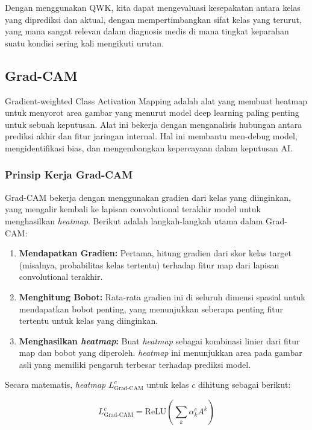 Dengan menggunakan QWK, kita dapat mengevaluasi kesepakatan antara kelas yang diprediksi dan aktual, dengan mempertimbangkan sifat kelas yang terurut, yang mana sangat relevan dalam diagnosis medis di mana tingkat keparahan suatu kondisi sering kali mengikuti urutan.

\subsection{Grad-CAM}
\label{sec:225}

Gradient-weighted Class Activation Mapping adalah alat yang membuat heatmap untuk menyorot area gambar yang menurut model deep learning paling penting untuk sebuah keputusan. Alat ini bekerja dengan menganalisis hubungan antara prediksi akhir dan fitur jaringan internal. Hal ini membantu men-debug model, mengidentifikasi bias, dan mengembangkan kepercayaan dalam keputusan AI.

\subsubsection{Prinsip Kerja Grad-CAM}

Grad-CAM bekerja dengan menggunakan gradien dari kelas yang diinginkan, yang mengalir kembali ke lapisan convolutional terakhir model untuk menghasilkan \emph{heatmap}. Berikut adalah langkah-langkah utama dalam Grad-CAM:

\begin{enumerate}
    \item \textbf{Mendapatkan Gradien:} Pertama, hitung gradien dari skor kelas target (misalnya, probabilitas kelas tertentu) terhadap fitur map dari lapisan convolutional terakhir.
    \item \textbf{Menghitung Bobot:} Rata-rata gradien ini di seluruh dimensi spasial untuk mendapatkan bobot penting, yang menunjukkan seberapa penting fitur tertentu untuk kelas yang diinginkan.
    \item \textbf{Menghasilkan \emph{heatmap}:} Buat \emph{heatmap} sebagai kombinasi linier dari fitur map dan bobot yang diperoleh. \emph{heatmap} ini menunjukkan area pada gambar asli yang memiliki pengaruh terbesar terhadap prediksi model.
\end{enumerate}

Secara matematis, \emph{heatmap} \(L_{\text{Grad-CAM}}^c\) untuk kelas \(c\) dihitung sebagai berikut:

\begin{equation}
    \label{eq:heatMap}
L_{\text{Grad-CAM}}^c = \text{ReLU}\left(\sum_k \alpha_k^c A^k\right)
\end{equation}


